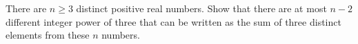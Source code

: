 There are $n \ge 3$ distinct positive real numbers. Show that there are at most $n-2$ different integer power of three that can be written as the sum of three distinct elements from these $n$ numbers.